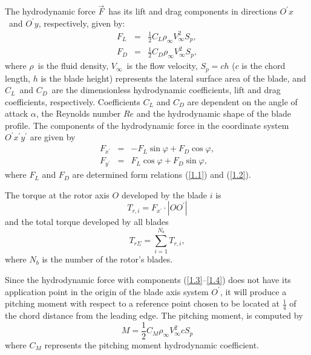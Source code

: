 \documentclass[12pt]{article}
\begin{document}
The hydrodynamic force $\overrightarrow{F}$\ has its lift and drag components in directions $O^{\prime }x$\ and $O^{\prime }y$, respectively, given by:
\begin{eqnarray}
F_{L} &=&\frac{1}{2}C_{L}\rho _{\infty }V_{\infty }^{2}S_{p},  \label{1.1} \\
F_{D} &=&\frac{1}{2}C_{D}\rho _{\infty }V_{\infty }^{2}S_{p},  \label{1.2}
\end{eqnarray}
where $\rho $\ is the fluid density, $V_{\infty }$\ is the flow velocity, $S_{p}=ch$ ($c$ is the chord length, $h$ is the blade height) represents the lateral surface area of the blade, and $C_{L}$\ and $C_{D}$\ are the
dimensionless hydrodynamic coefficients, lift and drag coefficients, respectively. Coefficients $C_{L}$ and $C_{D}$ are dependent on the angle of attack $\alpha $, the Reynolds number $Re$ and the hydrodynamic shape of the blade profile. The components of the hydrodynamic force in the coordinate system $O^{\prime }x^{\prime }y^{\prime }$ are given by
\begin{eqnarray}
F_{x^{\prime }} &=&-F_{L}\sin \varphi +F_{D}\cos \varphi,  \label{1.3} \\
F_{y^{\prime }} &=&F_{L}\cos \varphi +F_{D}\sin \varphi , \label{1.4}
\end{eqnarray}
where $F_L$ and $F_D$ are determined form relations (\ref{1.1}) and (\ref{1.2}). 

The torque at the rotor axis $O$ developed by the blade $i$ is
\begin{equation}
T_{r,i}=F_{x^{\prime }}\cdot \left\vert OO^{\prime }\right\vert  \label{1.5}
\end{equation}%
and the total torque developed by all blades
\begin{equation}
T_{r\Sigma }=\sum\limits_{i=1}^{N_{b}}T_{r,i},  \label{1.6}
\end{equation}%
where $N_{b}$ is the number of the rotor's blades.

Since the hydrodynamic force with components (\ref{1.3}--\ref{1.4}) does not have its application point in the
origin of the blade axis system $O^{\prime }$, it will produce a pitching
moment with respect to a reference point chosen to be located at $\frac{1}{4}$ of the chord distance from the leading edge. The pitching moment, is computed by
\begin{equation}
M=\frac{1}{2}C_{M}\rho _{\infty }V_{\infty }^{2}cS_{p}  \label{1.7}
\end{equation}
where $C_{M}$ represents the pitching moment hydrodynamic coefficient.
\end{document}

